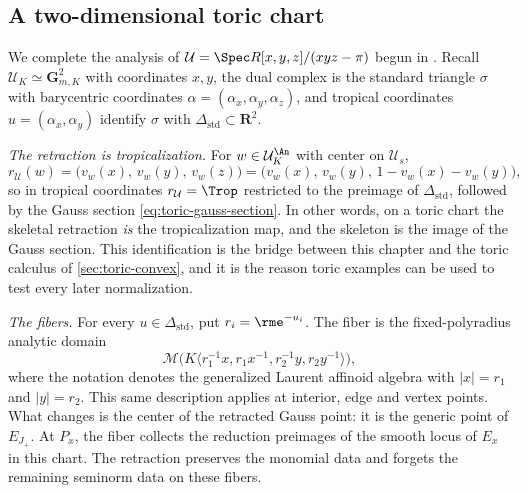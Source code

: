 \subsection{A two-dimensional toric chart}
\label{sec:worked-toric}

\begin{example}
\label{ex:worked-triangle}
We complete the analysis of $\mathcal U=\Spec R[x,y,z]/(xyz-\pi)$ begun in
. Recall $\mathcal U_K\simeq
\mathbf G_{m,K}^2$ with coordinates $x,y$, the dual complex is the
standard triangle $\sigma$ with barycentric coordinates
$\alpha=(\alpha_x,\alpha_y,\alpha_z)$, and tropical coordinates
$u=(\alpha_x,\alpha_y)$ identify $\sigma$ with
$\Delta_{\mathrm{std}}\subset\mathbf R^2$.

\emph{The retraction is tropicalization.} For $w\in\mathcal U_K^{\An}$ with
center on $\mathcal U_s$,
\[
 r_{\mathcal U}(w)=\bigl(v_w(x),\,v_w(y),\,v_w(z)\bigr)
 =\bigl(v_w(x),\,v_w(y),\,1-v_w(x)-v_w(y)\bigr),
\]
so in tropical coordinates $r_{\mathcal U}=\Trop$ restricted to the
preimage of $\Delta_{\mathrm{std}}$, followed by the Gauss section
\eqref{eq:toric-gauss-section}. In other words, on a toric chart the
skeletal retraction \emph{is} the tropicalization map, and the skeleton is
the image of the Gauss section. This identification is the bridge between
this chapter and the toric calculus of \cref{sec:toric-convex}, and it is
the reason toric examples can be used to test every later normalization.

\emph{The fibers.} For every $u\in\Delta_{\mathrm{std}}$, put
$r_i=\rme^{-u_i}$. The fiber is the fixed-polyradius analytic domain
\[
 \mathcal M\bigl(K\langle r_1^{-1}x,r_1x^{-1},
                            r_2^{-1}y,r_2y^{-1}\rangle\bigr),
\]
where the notation denotes the generalized Laurent affinoid algebra with
$|x|=r_1$ and $|y|=r_2$. This same description applies at interior, edge
and vertex points. What changes is the center of the retracted Gauss
point: it is the generic point of $E_{J_+}$. At $P_x$, the fiber collects
the reduction preimages of the smooth locus of $E_x$ in this chart.
The retraction preserves the monomial data and forgets the remaining
seminorm data on these fibers.


\end{example}
